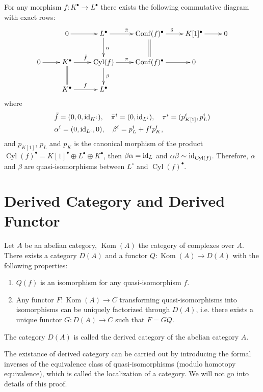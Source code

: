 \begin{pro}
	For any morphism $f:K^\bullet \to L^\bullet$ there exists the following commutative
	diagram with exact rows:
	\[
		\xymatrix{
			& 0\ar[r] & L^\bullet \ar[r]^{\bar\pi}\ar[d]^\alpha & \operatorname{Conf}(f)^\bullet \ar[r]^\delta\ar@{=}[d]
			& K[1]^\bullet \ar[r] & 0\\
			0 \ar[r] & K^\bullet \ar[r]^{\bar f}\ar@{=}[d] & \operatorname{Cyl}(f) \ar[r]^\pi\ar[d]^\beta 
			&\operatorname{Conf}(f)^\bullet \ar[r] & 0 & \\
			& K^\bullet \ar[r]^f & L^\bullet & & &
		}
	\]
	where
	\[
		\begin{aligned}
		&\bar f = (0,0,\operatorname{id}_{K^i}),\quad\bar\pi^i=(0,\operatorname{id}_{L^i}),\quad \pi^i=(p^i_{K[1]},p^i_{L})\\
		&\alpha^i = (0,\operatorname{id}_{L^i},0),\quad \beta^i= p^i_{L} + f^i p^i_K,
		\end{aligned}
	\]
	and $p_{K[1]}$, $p_{L}$ and $p_{K}$ is the canonical morphism of the product 
	$\operatorname{Cyl}(f)^\bullet=K[1]^\bullet\oplus L^\bullet\oplus K^\bullet$,
	then $\beta\alpha=\operatorname{id}_L$ and $\alpha\beta\sim \operatorname{id}_{\operatorname{Cyl}(f)}$.
	Therefore, $\alpha$ and $\beta$ are quasi-isomorphisms between $L^\circ$ and $\operatorname{Cyl}(f)^\bullet$.
\end{pro}


\section{Derived Category and Derived Functor}

\begin{definition}
	Let $A$ be an abelian category, $\operatorname{Kom}(A)$ the 
	category of complexes over $A$. There exists a category 
	$D(A)$ and a functor $Q:\operatorname{Kom}(A)\to D(A)$
	with the following properties:
	\begin{enumerate}
		\item $Q(f)$ is an isomorphism for any quasi-isomorphism $f$.
		\item Any functor $F:\operatorname{Kom}(A)\to C$ transforming
			quasi-isomorphisms into isomorphisms can be uniquely
			factorized through $D(A)$, i.e. there exists a unique 
			functor $G:D(A)\to C$ such that $F=GQ$.
	\end{enumerate}
	The category $D(A)$ is called the derived category of the abelian
	category $A$.
\end{definition}

The existance of derived category can be carried out by introducing 
the formal inverses of the equivalence class of quasi-isomorphisms 
(modulo homotopy equivalence), which is called the 
localization of a category. We will not go into details of this proof.


